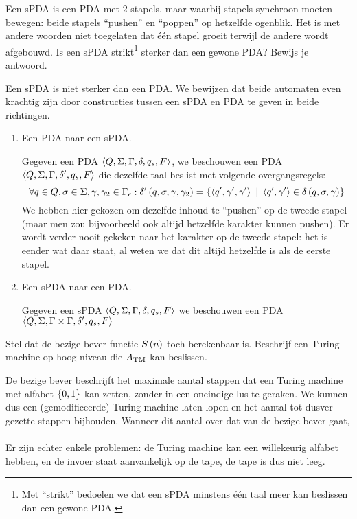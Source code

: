 \documentclass{article}
\begin{document}
\begin{question}
Een sPDA is een PDA met $2$ stapels, maar waarbij stapels synchroon moeten bewegen: beide stapels ``pushen'' en ``poppen'' op hetzelfde ogenblik. Het is met andere woorden niet toegelaten dat \'e\'en stapel groeit terwijl de andere wordt afgebouwd. Is een sPDA strikt\footnote{Met ``strikt'' bedoelen we dat een sPDA minstens \'e\'en taal meer kan beslissen dan een gewone PDA.} sterker dan een gewone PDA? Bewijs je antwoord.
\begin{answer}
Een sPDA is niet sterker dan een PDA. We bewijzen dat beide automaten even krachtig zijn door constructies tussen een sPDA en PDA te geven in beide richtingen.
\begin{enumerate}
 \item Een PDA naar een sPDA.
 \begin{construction}
  Gegeven een PDA $\left\langle Q,\Sigma,\Gamma,\delta,q_s,F \right\rangle$, we beschouwen een PDA $\left\langle Q,\Sigma,\Gamma,\delta',q_s,F \right\rangle$ die dezelfde taal beslist met volgende overgangsregels:
  \begin{equation}
  \forall q\in Q,\sigma\in\Sigma,\gamma,\gamma_2\in\Gamma_{\epsilon}:\delta'\left( q,\sigma,\gamma,\gamma_2 \right)=\left\{ \left\langle q',\gamma',\gamma' \right\rangle\ |\ \left\langle q',\gamma' \right\rangle\in\delta\left( q,\sigma,\gamma \right) \right\}
  \end{equation}
  We hebben hier gekozen om dezelfde inhoud te ``pushen'' op de tweede stapel (maar men zou bijvoorbeeld ook altijd hetzelfde karakter kunnen pushen). Er wordt verder nooit gekeken naar het karakter op de tweede stapel: het is eender wat daar staat, al weten we dat dit altijd hetzelfde is als de eerste stapel.
 \end{construction}
 \item Een sPDA naar een PDA.
 \begin{construction}
  Gegeven een sPDA $\left\langle Q,\Sigma,\Gamma,\delta,q_s,F \right\rangle$ we beschouwen een PDA $\left\langle Q,\Sigma,\Gamma\times\Gamma,\delta',q_s,F \right\rangle$
 \end{construction}
\end{enumerate}
\end{answer}
\end{question}

\begin{question}
Stel dat de bezige bever functie $S\left( n \right)$ toch berekenbaar is. Beschrijf een Turing machine op hoog niveau die $A_{\rm TM}$ kan beslissen.
\begin{answer}
De bezige bever beschrijft het maximale aantal stappen dat een Turing machine met alfabet $\left\{ 0,1 \right\}$ kan zetten, zonder in een oneindige lus te geraken. We kunnen dus een (gemodificeerde) Turing machine laten lopen en het aantal tot dusver gezette stappen bijhouden. Wanneer dit aantal over dat van de bezige bever gaat, 

\paragraph{}
Er zijn echter enkele problemen: de Turing machine kan een willekeurig alfabet hebben, en de invoer staat aanvankelijk op de tape, de tape is dus niet leeg.
\end{answer}
\end{question}
\end{document}
